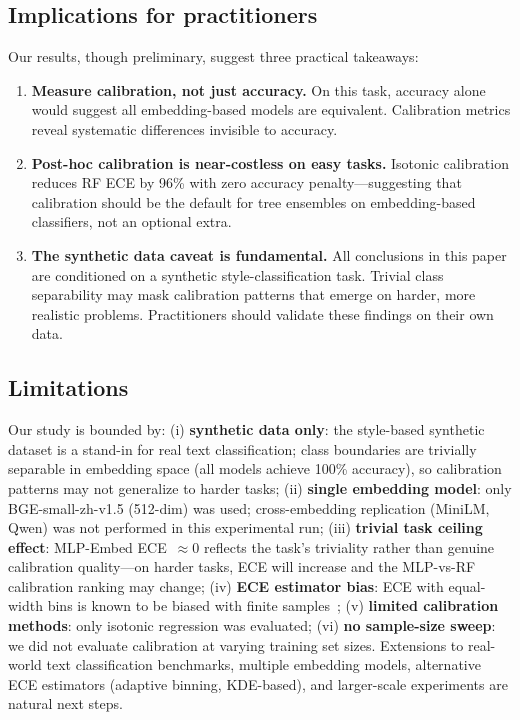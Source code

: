 \documentclass[11pt]{article}
\begin{document}
\subsection{Implications for practitioners}

Our results, though preliminary, suggest three practical takeaways:

\begin{enumerate}[leftmargin=*,nosep]
 \item \textbf{Measure calibration, not just accuracy.} On this task, accuracy alone would suggest all embedding-based models are equivalent. Calibration metrics reveal systematic differences invisible to accuracy.
 \item \textbf{Post-hoc calibration is near-costless on easy tasks.} Isotonic calibration reduces RF ECE by 96\% with zero accuracy penalty---suggesting that calibration should be the default for tree ensembles on embedding-based classifiers, not an optional extra.
 \item \textbf{The synthetic data caveat is fundamental.} All conclusions in this paper are conditioned on a synthetic style-classification task. Trivial class separability may mask calibration patterns that emerge on harder, more realistic problems. Practitioners should validate these findings on their own data.
\end{enumerate}

\subsection{Limitations}
\label{sec:limitations}

Our study is bounded by: (i) \textbf{synthetic data only}: the style-based synthetic dataset is a stand-in for real text classification; class boundaries are trivially separable in embedding space (all models achieve 100\% accuracy), so calibration patterns may not generalize to harder tasks; (ii) \textbf{single embedding model}: only BGE-small-zh-v1.5 (512-dim) was used; cross-embedding replication (MiniLM, Qwen) was not performed in this experimental run; (iii) \textbf{trivial task ceiling effect}: MLP-Embed ECE~${\approx}0$ reflects the task's triviality rather than genuine calibration quality---on harder tasks, ECE will increase and the MLP-vs-RF calibration ranking may change; (iv) \textbf{ECE estimator bias}: ECE with equal-width bins is known to be biased with finite samples~\cite{kumar2019verified}; (v) \textbf{limited calibration methods}: only isotonic regression was evaluated; (vi) \textbf{no sample-size sweep}: we did not evaluate calibration at varying training set sizes. Extensions to real-world text classification benchmarks, multiple embedding models, alternative ECE estimators (adaptive binning, KDE-based), and larger-scale experiments are natural next steps.
\end{document}
